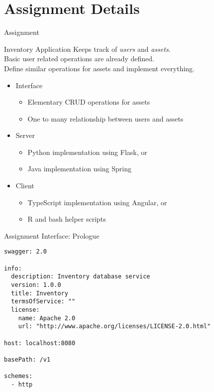\section{Assignment Details}


\begin{frame}{Assignment}
    \begin{block}{Inventory Application}
        Keeps track of \emph{users} and \emph{assets}. \\
        Basic user related operations are already defined. \\
        Define similar operations for assets and implement everything.
    \end{block}

    \begin{itemize}
        \item Interface
        \begin{itemize}
            \item Elementary CRUD operations for assets
            \item One to many relationship between users and assets
        \end{itemize}
        \item Server
        \begin{itemize}
            \item Python implementation using Flask, or
            \item Java implementation using Spring
        \end{itemize}
        \item Client
        \begin{itemize}
            \item TypeScript implementation using Angular, or
            \item R and bash helper scripts
        \end{itemize}
    \end{itemize}
\end{frame}


\begin{frame}[fragile]{Assignment Interface: Prologue}
\begin{lstlisting}[language=swagger,style=mini]
swagger: 2.0

info:
  description: Inventory database service
  version: 1.0.0
  title: Inventory
  termsOfService: ""
  license:
    name: Apache 2.0
    url: "http://www.apache.org/licenses/LICENSE-2.0.html"

host: localhost:8080

basePath: /v1

schemes:
  - http
\end{lstlisting}
\end{frame}


